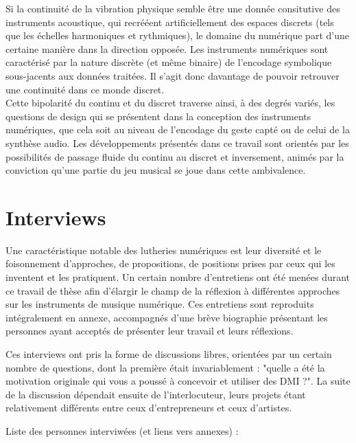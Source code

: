 Si la continuité de la vibration physique semble être une donnée consitutive des instruments acoustique, qui recrééent artificiellement des espaces discrets (tels que les échelles harmoniques et rythmiques), le domaine du numérique part d'une certaine manière dans la direction opposée. Les instruments numériques sont caractérisé par la nature discrète (et même binaire) de l'encodage symbolique sous-jacents aux données traitées. Il s'agit donc davantage de pouvoir retrouver une continuité dans ce monde discret.\\
Cette bipolarité du continu et du discret traverse ainsi, à des degrés variés, les questions de design qui se présentent dans la conception des instruments numériques, que cela soit au niveau de l'encodage du geste capté ou de celui de la synthèse audio. Les développements présentés dans ce travail sont orientés par les possibilités de passage fluide du continu au discret et inversement, animés par la conviction qu'une partie du jeu musical se joue dans cette ambivalence.


\section{Interviews}

Une caractéristique notable des lutheries numériques est leur diversité et le foisonnement d'approches, de propositions, de positions prises par ceux qui les inventent et les pratiquent. Un certain nombre d'entretiens ont été menées durant ce travail de thèse afin d'élargir le champ de la réflexion à différentes approches sur les instruments de musique numérique. Ces entretiens sont reproduits intégralement en annexe, accompagnés d'une brève biographie présentant les personnes ayant acceptés de présenter leur travail et leurs réflexions.

Ces interviews ont pris la forme de discussions libres, orientées par un certain nombre de questions, dont la première était invariablement : "quelle a été la motivation originale qui vous a poussé à concevoir et utiliser des DMI ?". La suite de la discussion dépendait ensuite de l'interlocuteur, leurs projets étant relativement différents entre ceux d'entrepreneurs et ceux d'artistes. %


Liste des personnes interviwées (et liens vers annexes) :

